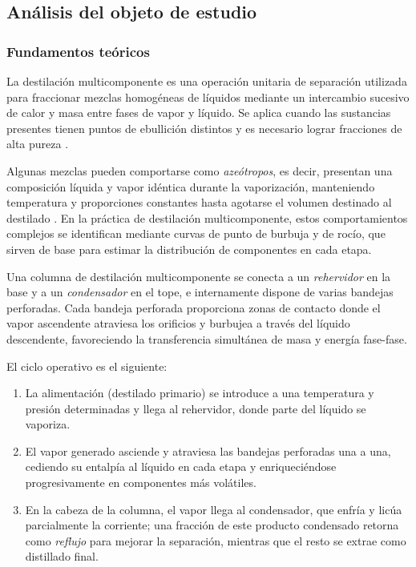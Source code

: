 \subsection{Análisis del objeto de estudio}

\subsubsection{Fundamentos teóricos}
La destilación multicomponente es una operación unitaria de separación utilizada para fraccionar mezclas homogéneas de líquidos mediante un intercambio sucesivo de calor y masa entre fases de vapor y líquido. Se aplica cuando las sustancias presentes tienen puntos de ebullición distintos y es necesario lograr fracciones de alta pureza \parencite{subsec5_3ref1}.

Algunas mezclas pueden comportarse como \emph{azeótropos}, es decir, presentan una composición líquida y vapor idéntica durante la vaporización, manteniendo temperatura y proporciones constantes hasta agotarse el volumen destinado al destilado \parencite{subsec5_3ref2}. En la práctica de destilación multicomponente, estos comportamientos complejos se identifican mediante curvas de punto de burbuja y de rocío, que sirven de base para estimar la distribución de componentes en cada etapa.

Una columna de destilación multicomponente se conecta a un \emph{rehervidor} en la base y a un \emph{condensador} en el tope, e internamente dispone de varias bandejas perforadas. Cada bandeja perforada proporciona zonas de contacto donde el vapor ascendente atraviesa los orificios y burbujea a través del líquido descendente, favoreciendo la transferencia simultánea de masa y energía fase-fase.

El ciclo operativo es el siguiente:
\begin{enumerate}
    \item La alimentación (destilado primario) se introduce a una temperatura y presión determinadas y llega al rehervidor, donde parte del líquido se vaporiza.
    \item El vapor generado asciende y atraviesa las bandejas perforadas una a una, cediendo su entalpía al líquido en cada etapa y enriqueciéndose progresivamente en componentes más volátiles.
    \item En la cabeza de la columna, el vapor llega al condensador, que enfría y licúa parcialmente la corriente; una fracción de este producto condensado retorna como \emph{reflujo} para mejorar la separación, mientras que el resto se extrae como distillado final.
\end{enumerate}

